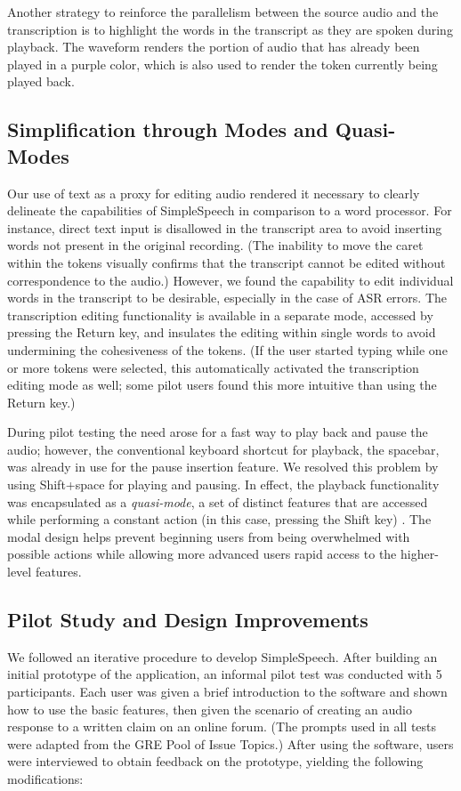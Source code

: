 Another strategy to reinforce the parallelism between the source audio and the transcription is to highlight the words in the transcript as they are spoken during playback.
The waveform renders the portion of audio that has already been played in a purple color, which is also used to render the token currently being played back.

\subsection{Simplification through Modes and Quasi-Modes}
Our use of text as a proxy for editing audio rendered it necessary to clearly delineate the capabilities of SimpleSpeech in comparison to a word processor.
For instance, direct text input is disallowed in the transcript area to avoid inserting words not present in the original recording.
(The inability to move the caret within the tokens visually confirms that the transcript cannot be edited without correspondence to the audio.)
However, we found the capability to edit individual words in the transcript to be desirable, especially in the case of ASR errors.
The transcription editing functionality is available in a separate mode, accessed by pressing the Return key, and insulates the editing within single words to avoid undermining the cohesiveness of the tokens. 
(If the user started typing while one or more tokens were selected, this automatically activated the transcription editing mode as well; some pilot users found this more intuitive than using the Return key.)

During pilot testing the need arose for a fast way to play back and pause the audio; however, the conventional keyboard shortcut for playback, the spacebar, was already in use for the pause insertion feature.
We resolved this problem by using Shift+space for playing and pausing.
In effect, the playback functionality was encapsulated as a \emph{quasi-mode}, a set of distinct features that are accessed while performing a constant action (in this case, pressing the Shift key) \cite{raskin}. 
The modal design helps prevent beginning users from being overwhelmed with possible actions while allowing more advanced users rapid access to the higher-level features.

\subsection{Pilot Study and Design Improvements}
We followed an iterative procedure to develop SimpleSpeech.
After building an initial prototype of the application, an informal pilot test was conducted with 5 participants. 
Each user was given a brief introduction to the software and shown how to use the basic features, then given the scenario of creating an audio response to a written claim on an online forum. 
(The prompts used in all tests were adapted from the GRE Pool of Issue Topics.) 
After using the software, users were interviewed to obtain feedback on the prototype, yielding the following modifications:

